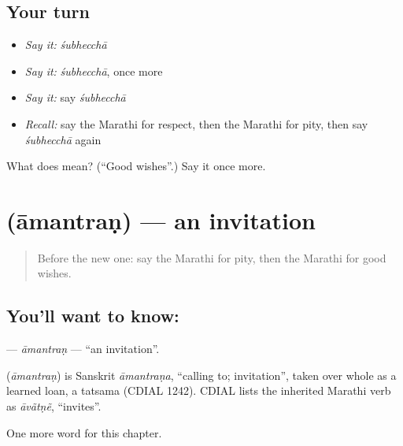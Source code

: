 \subsection*{Your turn}
\begin{itemize}
\raggedright
  \item \emph{Say it:} \emph{śubhecchā}
  \item \emph{Say it:} \emph{śubhecchā}, once more
  \item \emph{Say it:} say \emph{śubhecchā}
  \item \emph{Recall:} say the Marathi for respect, then the Marathi for pity, then say \emph{śubhecchā} again
\end{itemize}

\begin{tcolorbox}[breakable,colback=teal!4,colframe=teal!35!black,title={Before you move on}]
What does  mean? (\textquotedblleft{}Good wishes\textquotedblright{}.) Say it once more.
\end{tcolorbox}
\section[\texorpdfstring{\mr{आमंत्रण} (āmantraṇ)}{आमंत्रण (āmantraṇ)}]{ (āmantraṇ) — an invitation}

\label{lesson:MR-C274-amantran}



\begin{quote}
Before the new one: say the Marathi for pity, then the Marathi for good wishes.
\end{quote}

\subsection*{You'll want to know: }
\textbf{} — \emph{āmantraṇ} — \textquotedblleft{}an invitation\textquotedblright{}.

\begin{cousinweb}
\textbf{} (\emph{āmantraṇ}) is Sanskrit \emph{āmantraṇa}, \textquotedblleft{}calling to; invitation\textquotedblright{}, taken over whole as a learned loan, a tatsama (CDIAL 1242). CDIAL lists the inherited Marathi verb as \emph{āvãtṇẽ}, \textquotedblleft{}invites\textquotedblright{}.
\end{cousinweb}

\begin{grammarlens}[title={What you've built}]
One more word for this chapter.
\end{grammarlens}

